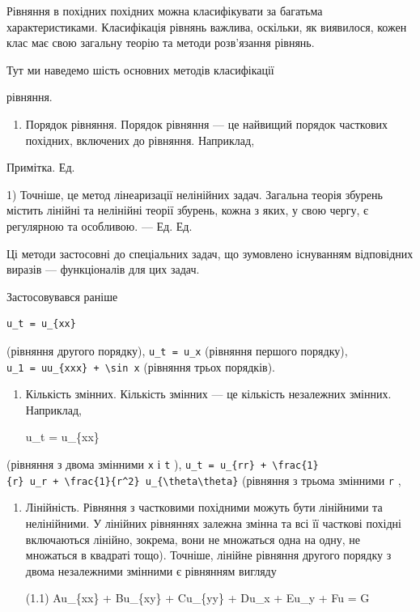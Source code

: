 \documentclass[
  ukrainian,
]{article}
\providecommand{\tightlist}{%
  \setlength{\itemsep}{0pt}\setlength{\parskip}{0pt}}
\begin{document}
Рівняння в похідних похідних можна класифікувати за багатьма
характеристиками. Класифікація рівнянь важлива, оскільки, як виявилося,
кожен клас має свою загальну теорію та методи розв'язання рівнянь.

Тут ми наведемо шість основних методів класифікації

рівняння.

\begin{enumerate}
\def\labelenumi{\arabic{enumi}.}
\tightlist
\item
  Порядок рівняння. Порядок рівняння --- це найвищий порядок часткових
  похідних, включених до рівняння. Наприклад,
\end{enumerate}

Примітка. Ед.

1) Точніше, це метод лінеаризації нелінійних задач. Загальна теорія
збурень містить лінійні та нелінійні теорії збурень, кожна з яких, у
свою чергу, є регулярною та особливою. --- Ед. Ед.

Ці методи застосовні до спеціальних задач, що зумовлено існуванням
відповідних виразів --- функціоналів для цих задач.

Застосовувався раніше

\begin{verbatim}
u_t = u_{xx}
\end{verbatim}

(рівняння другого порядку), \texttt{u\_t\ =\ u\_x} (рівняння першого
порядку), \texttt{u\_1\ =\ uu\_\{xxx\}\ +\ \textbackslash{}sin\ x}
(рівняння трьох порядків).

\begin{enumerate}
\def\labelenumi{\arabic{enumi}.}
\setcounter{enumi}{1}
\item
  Кількість змінних. Кількість змінних --- це кількість незалежних
  змінних. Наприклад,

  u\_t = u\_\{xx\}
\end{enumerate}

(рівняння з двома змінними \texttt{x} і \texttt{t} ),
\texttt{u\_t\ =\ u\_\{rr\}\ +\ \textbackslash{}frac\{1\}\{r\}\ u\_r\ +\ \textbackslash{}frac\{1\}\{r\^{}2\}\ u\_\{\textbackslash{}theta\textbackslash{}theta\}}
(рівняння з трьома змінними \texttt{r} ,

\begin{enumerate}
\def\labelenumi{\arabic{enumi}.}
\setcounter{enumi}{2}
\item
  Лінійність. Рівняння з частковими похідними можуть бути лінійними та
  нелінійними. У лінійних рівняннях залежна змінна та всі її часткові
  похідні включаються лінійно, зокрема, вони не множаться одна на одну,
  не множаться в квадраті тощо). Точніше, лінійне рівняння другого
  порядку з двома незалежними змінними є рівнянням вигляду

  (1.1) Au\_\{xx\} + Bu\_\{xy\} + Cu\_\{yy\} + Du\_x + Eu\_y + Fu = G
\end{enumerate}
\end{document}
